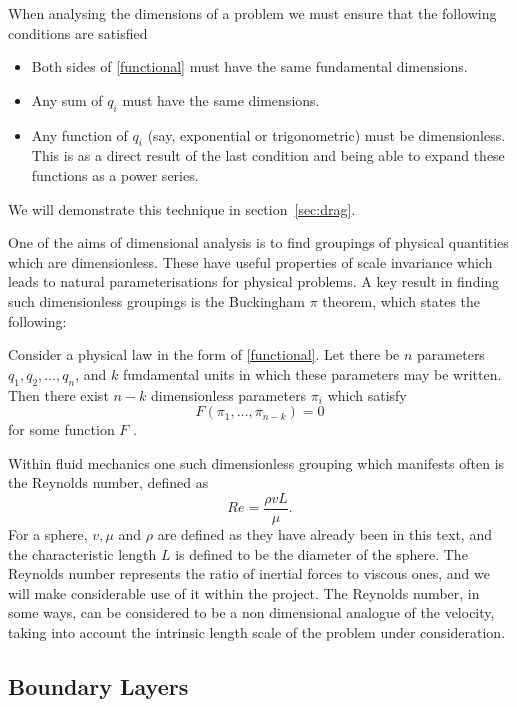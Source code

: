 When analysing the dimensions of a problem we must ensure that the following conditions are
satisfied
\begin{itemize}
\item Both sides of \eqref{functional} must have the same fundamental dimensions.
\item Any sum of $q_i$ must have the same dimensions.
\item Any function of $q_i$ (say, exponential or trigonometric) must be dimensionless. This is as a 
direct result of the last condition and being able to expand these functions as a power series.
\end{itemize}

We will demonstrate this technique in section~\ref{sec:drag}.

One of the aims of dimensional analysis is to find groupings of physical quantities which are
dimensionless. These have useful properties of scale invariance which leads to natural parameterisations
for physical problems. A key result in finding such dimensionless groupings is the Buckingham $\pi$ 
theorem, which states the following:

\begin{bucktheorem}[Buckingham $\pi$]
Consider a physical law in the form of \eqref{functional}. Let there be $n$ parameters $q_1,q_2,\ldots,q_n$,
and $k$ fundamental units in which these parameters may be written. Then there exist $n-k$ dimensionless
parameters $\pi_i$ which satisfy
\[
F(\pi_1, \ldots, \pi_{n-k}) = 0
\]
for some function $F$ \citet{0143-0807-31-4-019}.
\end{bucktheorem}

Within fluid mechanics one such dimensionless grouping which manifests often is the Reynolds
number, defined as 
\begin{equation} \label{re-number}
Re = \frac{\rho v L}{\mu} .
\end{equation}
For a sphere, $v, \mu$ and $\rho$ are defined as they have already been in this text, and the
characteristic length $L$ is defined to be the diameter of the sphere.
The Reynolds number represents the ratio of inertial forces to viscous ones, and we will make considerable
use of it within the project. The Reynolds number, in some ways, can be considered to be a non
dimensional analogue of the velocity, taking into account the intrinsic length scale of the problem
under consideration.

\subsection{Boundary Layers}

